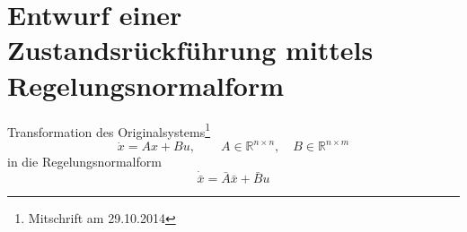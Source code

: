 \documentclass[ngerman]{tudscrreprt}
\begin{document}
\section{Entwurf einer Zustandsrückführung mittels Regelungsnormalform}
Transformation des Originalsystems\footnote{Mitschrift am 29.10.2014}
\begin{equation*}
\dot x = Ax + Bu,\qquad A\in \mathbb{R}^{n\times n},\quad B\in\mathbb{R}^{n\times m}
\end{equation*}
in die Regelungsnormalform
\begin{equation*}
\dot{\bar{x}} = \bar{A}\bar{x} + \bar{B} u
\end{equation*}
\end{document}
